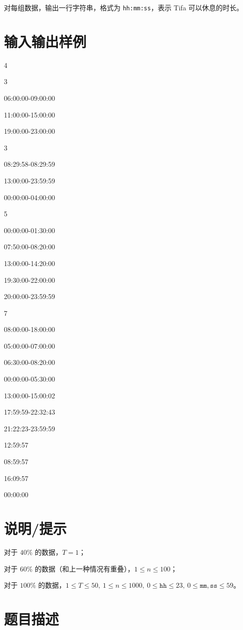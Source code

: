 \documentclass{../cpct/ctpro}
\begin{document}
对每组数据，输出一行字符串，格式为 \texttt{hh:mm:ss}，表示 Tifa 可以休息的时长。

\section*{输入输出样例}
\testcasetab
{
    4 \par
    3 \par
    06:00:00-09:00:00 \par
    11:00:00-15:00:00 \par
    19:00:00-23:00:00 \par
    3 \par
    08:29:58-08:29:59 \par
    13:00:00-23:59:59 \par
    00:00:00-04:00:00 \par
    5 \par
    00:00:00-01:30:00 \par
    07:50:00-08:20:00 \par
    13:00:00-14:20:00 \par
    19:30:00-22:00:00 \par
    20:00:00-23:59:59 \par
    7 \par
    08:00:00-18:00:00 \par
    05:00:00-07:00:00 \par
    06:30:00-08:20:00 \par
    00:00:00-05:30:00 \par
    13:00:00-15:00:02 \par
    17:59:59-22:32:43 \par
    21:22:23-23:59:59
}
{
    12:59:57 \par
    08:59:57 \par
    16:09:57 \par
    00:00:00
}

\section*{说明/提示}

对于 $40 \%$ 的数据，$T = 1$；

对于 $60 \%$ 的数据（和上一种情况有重叠），$1 \leq n \leq 100$；

对于 $100 \%$ 的数据，$1 \leq T \leq 50,~1 \leq n \leq 1000,~0 \leq \texttt{hh} \leq 23,~0 \leq \texttt{mm},\texttt{ss} \leq 59$。

\makeproblem
\section*{题目描述}
\end{document}
